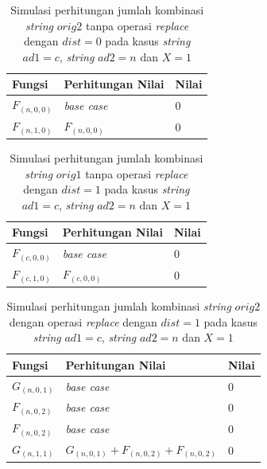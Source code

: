 \begin{appendices}
  \begin{table}[H]
  	\centering
  	\begin{tabular} {|p{3cm}|p{5cm}|p{1cm}|} \hline
  		Fungsi & Perhitungan Nilai & Nilai \\ \hline
  		$ F_{(n, 0, 0)} $ & \textit{base case} & $ 0 $ \\ \hline
  		\rowcolor{LightCyan}
  		$ F_{(n, 1, 0)}  $ & $F_{(n, 0, 0)}$ & $ 0 $ \\ \hline
  	\end{tabular}\caption{Simulasi perhitungan jumlah kombinasi \textit{string} $ orig2 $ tanpa operasi \textit{replace} dengan $ dist= 0  $ pada kasus \textit{string} $ ad1=c $, \textit{string} $ ad2=n $ dan $ X=1 $}
  	\label{tab:f_2_orig2_0_1}
  \end{table}
  
  
  
  \begin{table}[H]
  	\centering
  	\begin{tabular} {|p{3cm}|p{5cm}|p{1cm}|} \hline
  		Fungsi & Perhitungan Nilai & Nilai \\ \hline
  		$ F_{(c, 0, 0)} $ & \textit{base case} & $ 0 $ \\ \hline
  		\rowcolor{LightCyan}
  		$ F_{(c, 1, 0)}  $ & $F_{(c, 0, 0)}$ & $ 0 $ \\ \hline
  	\end{tabular}\caption{Simulasi perhitungan jumlah kombinasi \textit{string} $ orig1 $ tanpa operasi \textit{replace} dengan $ dist= 1  $ pada kasus \textit{string} $ ad1=c $, \textit{string} $ ad2=n $ dan $ X=1 $}
  	\label{tab:f_2_orig1_1_1}
  \end{table}
  
  \begin{table}[H]
  	\centering
  	\begin{tabular} {|p{3cm}|p{5cm}|p{1cm}|} \hline
  		Fungsi & Perhitungan Nilai & Nilai \\ \hline
  		$ G_{(n, 0, 1)} $ & \textit{base case} & $ 0 $ \\ \hline
  		$ F_{(n, 0, 2)} $ & \textit{base case} & $ 0 $ \\ \hline
  		$ F_{(n, 0, 2)} $ & \textit{base case} & $ 0 $ \\ \hline
  		\rowcolor{LightCyan}
  		$ G_{(n, 1, 1)}  $ & $G_{(n, 0, 1)} + F_{(n, 0, 2)} + F_{(n, 0, 2)}$ & $ 0 $ \\ \hline
  	\end{tabular}\caption{Simulasi perhitungan jumlah kombinasi \textit{string} $ orig2 $ dengan operasi \textit{replace} dengan $ dist= 1  $ pada kasus \textit{string} $ ad1=c $, \textit{string} $ ad2=n $ dan $ X=1 $}
  	\label{tab:g_2_orig2_1_1}
  \end{table}
  

\end{appendices}
